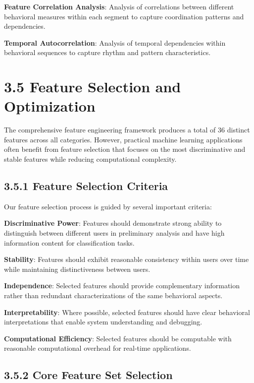 \documentclass[
  12pt,
  a4paper,
]{report}
\begin{document}
\textbf{Feature Correlation Analysis}: Analysis of correlations between
different behavioral measures within each segment to capture
coordination patterns and dependencies.

\textbf{Temporal Autocorrelation}: Analysis of temporal dependencies
within behavioral sequences to capture rhythm and pattern
characteristics.

\section{3.5 Feature Selection and
Optimization}\label{feature-selection-and-optimization}

The comprehensive feature engineering framework produces a total of 36
distinct features across all categories. However, practical machine
learning applications often benefit from feature selection that focuses
on the most discriminative and stable features while reducing
computational complexity.

\subsection{3.5.1 Feature Selection
Criteria}\label{feature-selection-criteria}

Our feature selection process is guided by several important criteria:

\textbf{Discriminative Power}: Features should demonstrate strong
ability to distinguish between different users in preliminary analysis
and have high information content for classification tasks.

\textbf{Stability}: Features should exhibit reasonable consistency
within users over time while maintaining distinctiveness between users.

\textbf{Independence}: Selected features should provide complementary
information rather than redundant characterizations of the same
behavioral aspects.

\textbf{Interpretability}: Where possible, selected features should have
clear behavioral interpretations that enable system understanding and
debugging.

\textbf{Computational Efficiency}: Selected features should be
computable with reasonable computational overhead for real-time
applications.

\subsection{3.5.2 Core Feature Set
Selection}\label{core-feature-set-selection}
\end{document}
